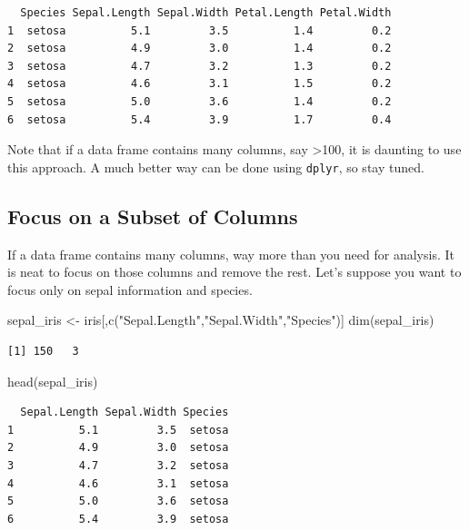 \documentclass[
  letterpaper,
]{book}
\newenvironment{Shaded}{\begin{snugshade}}{\end{snugshade}}
\newcommand{\FunctionTok}[1]{\textcolor[rgb]{0.28,0.35,0.67}{#1}}
\newcommand{\NormalTok}[1]{\textcolor[rgb]{0.00,0.23,0.31}{#1}}
\newcommand{\OtherTok}[1]{\textcolor[rgb]{0.00,0.23,0.31}{#1}}
\newcommand{\StringTok}[1]{\textcolor[rgb]{0.13,0.47,0.30}{#1}}
\begin{document}
\begin{verbatim}
  Species Sepal.Length Sepal.Width Petal.Length Petal.Width
1  setosa          5.1         3.5          1.4         0.2
2  setosa          4.9         3.0          1.4         0.2
3  setosa          4.7         3.2          1.3         0.2
4  setosa          4.6         3.1          1.5         0.2
5  setosa          5.0         3.6          1.4         0.2
6  setosa          5.4         3.9          1.7         0.4
\end{verbatim}

Note that if a data frame contains many columns, say \textgreater100, it
is daunting to use this approach. A much better way can be done using
\texttt{dplyr}, so stay tuned.

\subsection{Focus on a Subset of
Columns}\label{focus-on-a-subset-of-columns}

If a data frame contains many columns, way more than you need for
analysis. It is neat to focus on those columns and remove the rest.
Let's suppose you want to focus only on sepal information and species.

\begin{Shaded}
\begin{Highlighting}[]
\NormalTok{sepal\_iris }\OtherTok{\textless{}{-}}\NormalTok{ iris[,}\FunctionTok{c}\NormalTok{(}\StringTok{"Sepal.Length"}\NormalTok{,}\StringTok{"Sepal.Width"}\NormalTok{,}\StringTok{"Species"}\NormalTok{)]}
\FunctionTok{dim}\NormalTok{(sepal\_iris)}
\end{Highlighting}
\end{Shaded}

\begin{verbatim}
[1] 150   3
\end{verbatim}

\begin{Shaded}
\begin{Highlighting}[]
\FunctionTok{head}\NormalTok{(sepal\_iris)}
\end{Highlighting}
\end{Shaded}

\begin{verbatim}
  Sepal.Length Sepal.Width Species
1          5.1         3.5  setosa
2          4.9         3.0  setosa
3          4.7         3.2  setosa
4          4.6         3.1  setosa
5          5.0         3.6  setosa
6          5.4         3.9  setosa
\end{verbatim}
\end{document}
